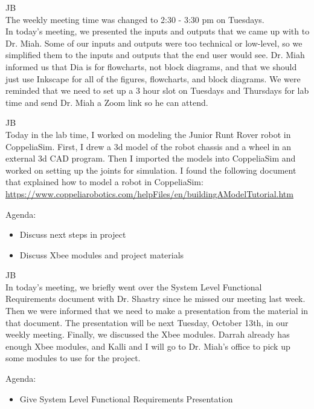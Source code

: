 \documentclass[fontsize=11pt, %
                             paper=letter, %
                             openany, %
                             captions=tableheading,
                             index=totoc,
                             hyperref]{labbook}
\begin{document}
\begin{addmargin}[0cm]{0cm}
JB\\
The weekly meeting time was changed to 2:30 - 3:30 pm on Tuesdays.\\
In today's meeting, we presented the inputs and outputs that we came up with to Dr. Miah. Some of our inputs and outputs were too technical or low-level, so we simplified them to the inputs and outputs that the end user would see. Dr. Miah informed us that Dia is for flowcharts, not block diagrams, and that we should just use Inkscape for all of the figures, flowcharts, and block diagrams. We were reminded that we need to set up a 3 hour slot on Tuesdays and Thursdays for lab time and send Dr. Miah a Zoom link so he can attend.



JB\\
Today in the lab time, I worked on modeling the Junior Runt Rover robot in CoppeliaSim. First, I drew a 3d model of the robot chassis and a wheel in an external 3d CAD program. Then I imported the models into CoppeliaSim and worked on setting up the joints for simulation. I found the following document that explained how to model a robot in CoppeliaSim: \href{https://www.coppeliarobotics.com/helpFiles/en/buildingAModelTutorial.htm}{https://www.coppeliarobotics.com/helpFiles/en/buildingAModelTutorial.htm}

Agenda:
\begin{itemize}
    \item Discuss next steps in project
    \item Discuss Xbee modules and project materials
\end{itemize}

JB\\
In today's meeting, we briefly went over the System Level Functional Requirements document with Dr. Shastry since he missed our meeting last week. Then we were informed that we need to make a presentation from the material in that document. The presentation will be next Tuesday, October 13th, in our weekly meeting. Finally, we discussed the Xbee modules. Darrah already has enough Xbee modules, and Kalli and I will go to Dr. Miah's office to pick up some modules to use for the project.


Agenda:
\begin{itemize}
    \item Give System Level Functional Requirements Presentation
\end{itemize}


\end{addmargin}
\end{document}
